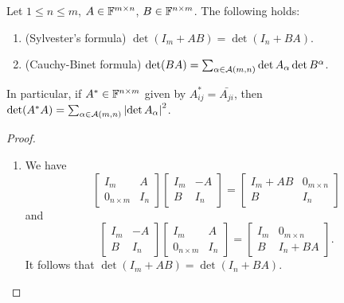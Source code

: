 \documentclass[a4paper]{article}
\begin{document}
\begin{thm}
  Let $1 \leq n \leq m$, $A \in \mathbb{F}^{m \times n}$, $B \in \mathbb{F}^{n \times m}$.
  The following holds:
  \begin{enumerate}
    \item (Sylvester's formula) $\det(I_m + A B)
            = \det(I_n + BA)$.

    \item (Cauchy-Binet formula) $\det(BA) = \sum_{\alpha
              \in \mathcal{A}(m, n)} \det A_\alpha \det B^\alpha$.
  \end{enumerate}
  In particular, if $A^* \in \mathbb{F}^{n \times m}$ given
  by $A^*_{ij} = \bar{A_{ji}}$, then
  $\det(A^* A) = \sum_{\alpha \in \mathcal{A}(m, n)}
    \left\lvert \det A_\alpha\right\rvert^2$.
\end{thm}

\begin{proof}
  \begin{enumerate}
    \item We have
          \[
            \begin{bmatrix}
              I_m            & A   \\
              0_{n \times m} & I_n
            \end{bmatrix}
            \begin{bmatrix}
              I_m & - A \\
              B   & I_n
            \end{bmatrix}
            = \begin{bmatrix}
              I_m + AB & 0_{m \times n} \\
              B        & I_n
            \end{bmatrix}
          \]
          and
          \[
            \begin{bmatrix}
              I_m & -A  \\
              B   & I_n
            \end{bmatrix}
            \begin{bmatrix}
              I_m            & A   \\
              0_{n \times m} & I_n
            \end{bmatrix}
            = \begin{bmatrix}
              I_m & 0_{m \times n} \\
              B   & I_n + BA
            \end{bmatrix}.
          \]
          It follows that $\det(I_m + AB) = \det(I_n + BA)$.


\end{enumerate}
\end{proof}
\end{document}
